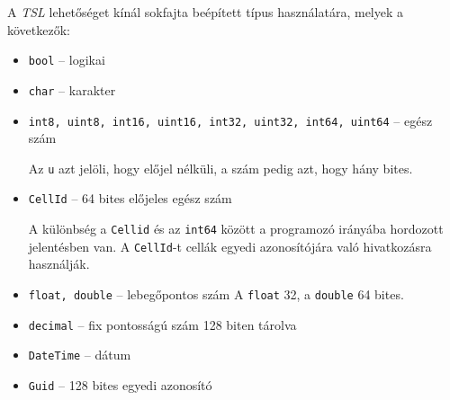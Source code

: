 A \emph{TSL} lehetőséget kínál sokfajta beépített típus használatára, melyek a következők:
\begin{itemize}
	\item \texttt{bool} \--- logikai
	\item \texttt{char} \--- karakter
	\item \texttt{int8, uint8, int16, uint16, int32, uint32, int64, uint64} \--- egész szám 
		
		Az \texttt{u} azt jelöli, hogy előjel nélküli, a szám pedig azt, hogy hány bites.
	\item \texttt{CellId} \--- 64 bites előjeles egész szám
		
		A különbség a \texttt{Cellid} és az \texttt{int64} között a programozó irányába hordozott jelentésben van. A \texttt{CellId}-t cellák egyedi azonosítójára való hivatkozásra használják.
	\item \texttt{float, double} \--- lebegőpontos szám
		A \texttt{float} 32, a \texttt{double} 64 bites.
	\item \texttt{decimal} \--- fix pontosságú szám 128 biten tárolva
	\item \texttt{DateTime} \--- dátum
	\item \texttt{Guid} \--- 128 bites egyedi azonosító
\end{itemize}

